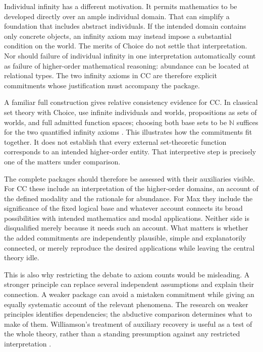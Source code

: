 \documentclass[11pt]{article}
\begin{document}
Individual infinity has a different motivation. It permits mathematics to be developed directly over an ample individual domain. That can simplify a foundation that includes abstract individuals. If the intended domain contains only concrete objects, an infinity axiom may instead impose a substantial condition on the world. The merits of Choice do not settle that interpretation. Nor should failure of individual infinity in one interpretation automatically count as failure of higher-order mathematical reasoning: abundance can be located at relational types. The two infinity axioms in CC are therefore explicit commitments whose justification must accompany the package.

A familiar full construction gives relative consistency evidence for CC. In classical set theory with Choice, use infinite individuals and worlds, propositions as sets of worlds, and full admitted function spaces; choosing both base sets to be $\mathbb N$ suffices for the two quantified infinity axioms \citep[\S\S2--4,6]{gallinnotes}. This illustrates how the commitments fit together. It does not establish that every external set-theoretic function corresponds to an intended higher-order entity. That interpretive step is precisely one of the matters under comparison.

The complete packages should therefore be assessed with their auxiliaries visible. For CC these include an interpretation of the higher-order domains, an account of the defined modality and the rationale for abundance. For Max they include the significance of the fixed logical base and whatever account connects its broad possibilities with intended mathematics and modal applications. Neither side is disqualified merely because it needs such an account. What matters is whether the added commitments are independently plausible, simple and explanatorily connected, or merely reproduce the desired applications while leaving the central theory idle.

This is also why restricting the debate to axiom counts would be misleading. A stronger principle can replace several independent assumptions and explain their connection. A weaker package can avoid a mistaken commitment while giving an equally systematic account of the relevant phenomena. The research on weaker principles identifies dependencies; the abductive comparison determines what to make of them. Williamson's treatment of auxiliary recovery is useful as a test of the whole theory, rather than a standing presumption against any restricted interpretation \citep[\S13.4, pp.~339--342]{williamson2017}.
\end{document}
